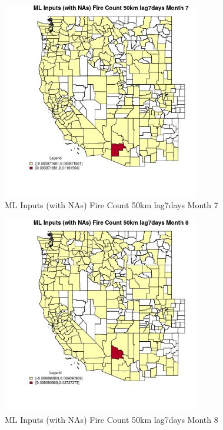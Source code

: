 \begin{figure} 
\centering  
\includegraphics[width=0.77\textwidth]{Code_Outputs/Report_ML_input_PM25_Step4_part_e_de_duplicated_aves_compiled_2019-05-20wNAs_CountyFire_Count_50km_lag7daysmedianMonth7.jpg} 
\caption{\label{fig:Report_ML_input_PM25_Step4_part_e_de_duplicated_aves_compiled_2019-05-20wNAsCountyFire_Count_50km_lag7daysmedianMonth7}ML Inputs (with NAs) Fire Count 50km lag7days Month 7} 
\end{figure} 
 

\begin{figure} 
\centering  
\includegraphics[width=0.77\textwidth]{Code_Outputs/Report_ML_input_PM25_Step4_part_e_de_duplicated_aves_compiled_2019-05-20wNAs_CountyFire_Count_50km_lag7daysmedianMonth8.jpg} 
\caption{\label{fig:Report_ML_input_PM25_Step4_part_e_de_duplicated_aves_compiled_2019-05-20wNAsCountyFire_Count_50km_lag7daysmedianMonth8}ML Inputs (with NAs) Fire Count 50km lag7days Month 8} 
\end{figure} 
 

